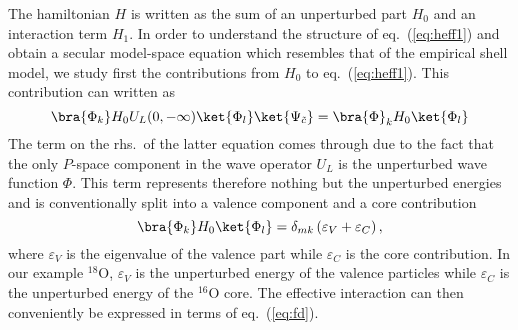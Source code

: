 The hamiltonian $H$ is written as the sum of an unperturbed part $H_0$ and an
interaction term $H_1$.
In order to understand the structure of eq.\
(\ref{eq:heff1}) and obtain a secular model-space equation which resembles
that of the empirical shell model, we study first the contributions from
$H_0$ to eq.\ (\ref{eq:heff1}). This contribution can written as
\begin{equation}
\bra{\Phi_k}
H_0U_L(0,-\infty )\ket{\Phi_l}\ket{\Psi_{\tilde{c}}} =
\bra{\Phi}_kH_0\ket{\Phi_l}
\end{equation}
The term on the rhs.\ of the
latter equation comes through due to the fact that the only $P$-space
component in the wave operator $U_L$ is the unperturbed
wave function $\Phi$. This term represents therefore nothing but the
unperturbed energies and is conventionally \cite{ko90}
split into a valence
component and a core contribution
\begin{equation}
 \bra{\Phi_k}H_0\ket{\Phi_l}=\delta_{mk}\left(
\varepsilon_V + \varepsilon_C \right),
\end{equation}
where $\varepsilon_V$ is the eigenvalue of the valence part while 
$\varepsilon_C$ is the core contribution. In our example 
$^{18}$O, $\varepsilon_V$ is the unperturbed energy of the valence
particles while $\varepsilon_C$ is the unperturbed energy of the
$^{16}$O core.  The effective interaction can then 
conveniently be expressed in terms of eq.\ (\ref{eq:fd}).

